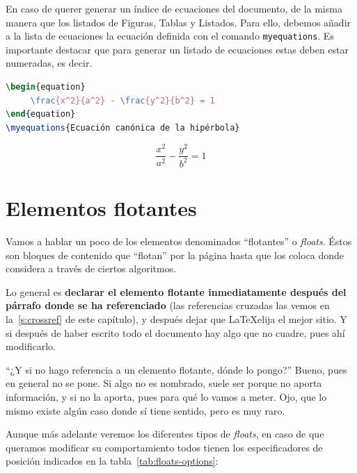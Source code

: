 En caso de querer generar un índice de ecuaciones del documento, de la misma manera que los listados de Figuras, Tablas y Listados. Para ello, debemos añadir a la lista de ecuaciones la ecuación definida con el comando \texttt{myequations}. Es importante destacar que para generar un listado de ecuaciones estas deben estar numeradas, es decir.

\begin{minipage}[c]{.5\textwidth}
\begin{lstlisting}[language=tex]
\begin{equation}
     \frac{x^2}{a^2} - \frac{y^2}{b^2} = 1
\end{equation}
\myequations{Ecuación canónica de la hipérbola}
\end{lstlisting}
\end{minipage}%
\begin{minipage}[c]{.5\textwidth}
\begin{equation}
     \frac{x^2}{a^2} - \frac{y^2}{b^2} = 1
\end{equation}
\end{minipage} 

\section{Elementos flotantes}

Vamos a hablar un poco de los elementos denominados \enquote{flotantes} o \textit{floats}. Éstos son bloques de contenido que \enquote{flotan} por la página hasta que  los coloca donde considera a través de ciertos algoritmos.

Lo general es \textbf{declarar el elemento flotante inmediatamente después del párrafo donde se ha referenciado} (las referencias cruzadas las vemos en la~\autoref{s:crossref} de este capítulo), y después dejar que \LaTeX\space elija el mejor sitio. Y si después de haber escrito todo el documento hay algo que no cuadre, pues ahí modificarlo.

\enquote{¿Y si no hago referencia a un elemento flotante, dónde lo pongo?} Bueno, pues en general no se pone. Si algo no es nombrado, suele ser porque no aporta información, y si no la aporta, pues para qué lo vamos a meter. Ojo, que lo mismo existe algún caso donde sí tiene sentido, pero es muy raro.

Aunque más adelante veremos los diferentes tipos de \textit{floats}, en caso de que queramos modificar su comportamiento todos tienen los especificadores de posición indicados en la tabla~\ref{tab:floats-options}:

